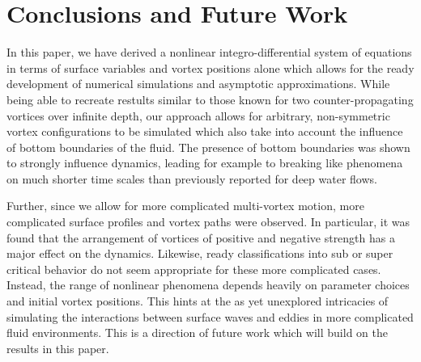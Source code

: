 \documentclass[a4paper,11pt]{article}
\begin{document}
\section{Conclusions and Future Work}
In this paper, we have derived a nonlinear integro-differential system of equations in terms of surface variables and vortex positions alone which allows for the ready development of numerical simulations and asymptotic approximations.  While being able to recreate restults similar to those known for two counter-propagating vortices over infinite depth, our approach allows for arbitrary, non-symmetric vortex configurations to be simulated which also take into account the influence of bottom boundaries of the fluid. The presence of bottom boundaries was shown to strongly influence dynamics, leading for example to breaking like phenomena on much shorter time scales than previously reported for deep water flows.  

Further, since we allow for more complicated multi-vortex motion, more complicated surface profiles and vortex paths were observed. In particular, it was found that the arrangement of vortices of positive and negative strength has a major effect on the dynamics.  Likewise, ready classifications into sub or super critical behavior do not seem appropriate for these more complicated cases.  Instead, the range of nonlinear phenomena depends heavily on parameter choices and initial vortex positions.  This hints at the as yet unexplored intricacies of simulating the interactions between surface waves and eddies in more complicated fluid environments.  This is a direction of future work which will build on the results in this paper.        

\end{document}
